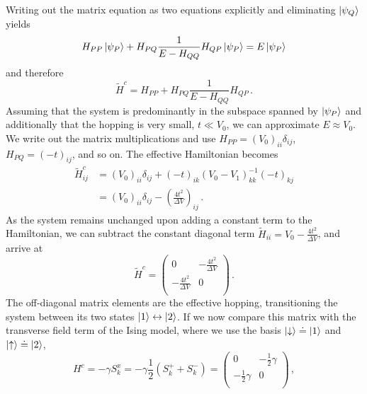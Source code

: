 %
Writing out the matrix equation as two equations explicitly and eliminating
$\left|\psi_Q\right>$ yields 
%
\begin{equation}
  H_{PP} \left|\psi_P\right> + H_{PQ} \frac{1}{E - H_{QQ}} H_{QP} \left|\psi_P\right>
  =
  E \left|\psi_P\right>
\end{equation}
%
and therefore
%
\begin{equation}
  \label{eq:H_effective}
  \tilde{H}^c = H_{PP} + H_{PQ} \frac{1}{E - H_{QQ}} H_{QP} \, .
\end{equation}
%
Assuming that the system is predominantly in the subspace spanned by
$\left|\psi_P\right>$ and additionally that the hopping is very small, $t \ll V_0$, we
can approximate $E \approx V_0$. We write out the matrix multiplications and use
$H_{PP} = \left( V_0 \right)_{ii} \delta_{ij}$, $H_{PQ} = \left( -t
\right)_{ij}$, and so on. The effective Hamiltonian becomes
%
\begin{equation}
\begin{split}
  \tilde{H}^c_{ij}
  &=
  \left( V_0 \right)_{ii} \delta_{ij}
  + \left( - t \right)_{ik}
    \left( V_0 - V_1 \right)^{-1}_{kk}
    \left( - t \right)_{kj} \\
  &=
  \left( V_0 \right)_{ii} \delta_{ij}
  - \left( \frac{4 t^2}{\Delta V} \right)_{ij} \, .
\end{split}
\end{equation}
%
As the system remains unchanged upon adding a constant term to the Hamiltonian,
we can subtract the constant diagonal term $\tilde{H}_{ii} = V_0 - \frac{4
t^2}{\Delta V}$, and arrive at
%
\begin{equation}
  \tilde{H}^c
  =
  \begin{pmatrix}
    0 & - \frac{4 t^2}{\Delta V} \\
    - \frac{4 t^2}{\Delta V} & 0 \\
  \end{pmatrix} \, .
\end{equation}
%
The off-diagonal matrix elements are the effective hopping, transitioning the
system between its two states $\left|1\right> \leftrightarrow \left|2\right>$. If we now
compare this matrix with the transverse field term of the Ising model, where we
use the basis $\left|\downarrow\right> \doteq \left|1\right>$ and $\left|\uparrow\right> \doteq
\left|2\right>$, 
%
\begin{equation}
  H^c = - \gamma S^x_k = - \gamma \frac{1}{2} \left( S^+_k + S^-_k \right)
  = 
  \begin{pmatrix}
    0 & - \frac{1}{2} \gamma \\
    - \frac{1}{2} \gamma & 0 \\
  \end{pmatrix} \, ,
\end{equation}

